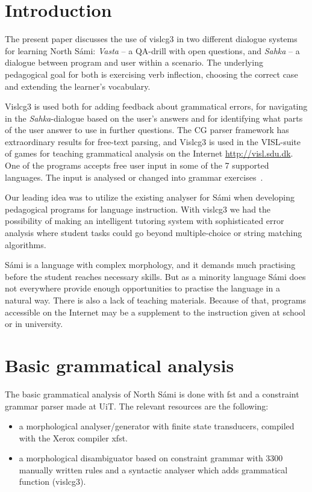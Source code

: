 \documentclass[11pt]{article}
\begin{document}
\section{Introduction} 

The present paper discusses the use of vislcg3 in two different dialogue systems for learning North Sámi: \textit{Vasta} -- a QA-drill with open questions, and \textit{Sahka} -- a  dialogue between program and user within a scenario. The underlying pedagogical goal for both is exercising verb inflection, choosing the correct case and extending the learner's vocabulary. 

Vislcg3 is used both for adding feedback about grammatical errors, for navigating in the \textit{Sahka}-dialogue based on the user's answers and for identifying what parts of the user answer to use in further questions. The CG parser framework has extraordinary results for free-text parsing, and Vislcg3 is used in the VISL-suite of games for teaching grammatical analysis on the Internet \url{http://visl.sdu.dk}. One of the programs accepts free user input in some of the 7 supported languages. The input is analysed or changed into grammar exercises~\cite{Bick:05}.

Our leading idea was to utilize the existing analyser for Sámi when developing pedagogical programs for language instruction. With vislcg3 we had the possibility of making an intelligent tutoring system with sophisticated error analysis where student tasks could go beyond multiple-choice or string matching algorithms. 

Sámi is a language with complex morphology, and it demands much practising before the student reaches necessary skills. But as a minority language Sámi does not everywhere provide enough opportunities to practise the language in a natural way. There is also a lack of teaching materials. Because of that, programs accessible on the Internet may be a supplement to the instruction given at school or in university. 

\section{Basic grammatical analysis}
The basic grammatical analysis of North Sámi is done with fst and a constraint grammar parser made at UiT. The relevant resources are the following:

\begin{itemize}
\item a morphological analyser/generator with finite state transducers, compiled with the Xerox compiler xfst.  
\item a morphological disambiguator based on constraint grammar with 3300 manually written rules and a syntactic analyser which adds grammatical function (vislcg3). 
\end{itemize} 
\end{document}
